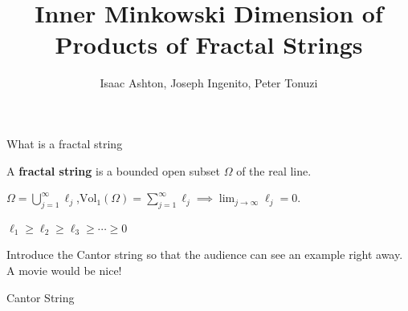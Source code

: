 \documentclass{if-beamer}
\title[]{Inner Minkowski Dimension of Products of Fractal Strings}
\subtitle{}
\author{Isaac Ashton, Joseph Ingenito, Peter Tonuzi}
\institute[]{The College of New Jersey}
\date{}
\begin{document}
\begin{frame}
  \titlepage
\end{frame}

\begin{frame}{What is a fractal string}

\begin{definition}
A {\bf fractal string} is a bounded open subset $\Omega$ of the real line.
\end{definition}

\pause
\vspace{.2 in}

$\Omega = \displaystyle\bigcup_{j = 1}^\infty \ell_j$,\qquad $\displaystyle\text{Vol}_1\left(\Omega\right) = \sum_{j = 1}^\infty \ell_j \implies \lim_{j \to \infty} \ell_j = 0$.

\pause
\vspace{.2 in}

$\ell_1 \geq \ell_2 \geq \ell_3 \geq \cdots \geq 0$

\pause
\vspace{.2 in}

{\color{red} Introduce the Cantor string so that the audience can see an example right away. A movie would be nice!}

\end{frame}

\begin{frame}{Cantor String}
	\begin{center}
	\end{center}
\end{frame}
\end{document}
